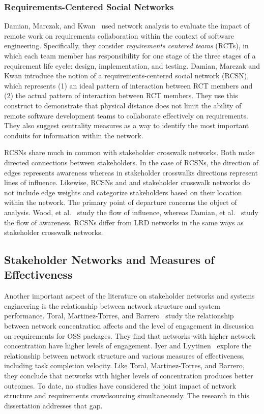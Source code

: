 \subsubsection{Requirements-Centered Social Networks}

Damian, Marczak, and Kwan~\cite{damian} used network analysis to evaluate the impact of remote work on requirements collaboration within the context of software engineering. Specifically, they consider \emph{requirements centered teams} (RCTs), in which each team member has responsibility for one stage of the three stages of a requirement life cycle: design, implementation, and testing. Damian, Marczak and Kwan introduce the notion of a requirements-centered social network (RCSN), which represents (1) an ideal pattern of interaction between RCT members and (2) the actual pattern of interaction between RCT members. They use this construct to demonstrate that physical distance does not limit the ability of remote software development teams to collaborate effectively on requirements. They also suggest centrality measures as a way to identify the most important conduits for information within the network. 

RCSNs share much in common with stakeholder crosswalk networks. Both make directed connections between stakeholders. In the case of RCSNs, the direction of edges represents awareness whereas in stakeholder crosswalks directions represent lines of influence. Likewise, RCSNs and and stakeholder crosswalk networks do not include edge weights and categorize stakeholders based on their location within the network. The primary point of departure concerns the object of analysis. Wood, et al.~\cite{wood} study the flow of influence, whereas Damian, et al.~\cite{damian} study the flow of awareness. RCSNs differ from LRD networks in the same ways as stakeholder crosswalk networks.

\subsection{Stakeholder Networks and Measures of Effectiveness}

Another important aspect of the literature on stakeholder networks and systems engineering is the relationship between network structure and system performance. Toral, Martinez-Torres, and Barrero~\cite{toral} study the relationship between network concentration affects and the level of engagement in discussion on requirements for OSS packages. They find that networks with higher network concentration have higher levels of engagement. Iyer and Lyytinen~\cite{iyer} explore the relationship between network structure and various measures of effectiveness, including task completion velocity. Like Toral, Martinez-Torres, and Barrero, they conclude that networks with higher levels of concentration produces better outcomes. To date, no studies have considered the joint impact of network structure and requirements crowdsourcing simultaneously. The research in this dissertation addresses that gap.  

